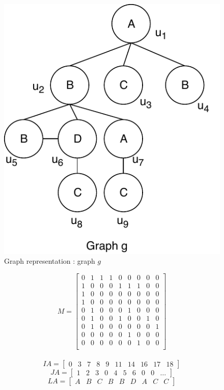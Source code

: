 \begin{figure}[h]
\centering 
\includegraphics[scale = 0.8]{images/csr.pdf}
\caption[Graph representation]{Graph representation : graph $g$} %
\label{fig:gallery} 
\end{figure}

\[
    M =
    \begin{bmatrix}
        0 & 1 & 1 & 1 & 0 & 0 & 0 & 0 & 0\\
        1 & 0 & 0 & 0 & 1 & 1 & 1 & 0 & 0\\
        1 & 0 & 0 & 0 & 0 & 0 & 0 & 0 & 0\\
        1 & 0 & 0 & 0 & 0 & 0 & 0 & 0 & 0\\
        0 & 1 & 0 & 0 & 0 & 1 & 0 & 0 & 0\\
        0 & 1 & 0 & 0 & 1 & 0 & 0 & 1 & 0\\
        0 & 1 & 0 & 0 & 0 & 0 & 0 & 0 & 1\\
        0 & 0 & 0 & 0 & 0 & 1 & 0 & 0 & 0\\
        0 & 0 & 0 & 0 & 0 & 0 & 1 & 0 & 0\\
    \end{bmatrix}
\]
\\
\[
    IA = 
    \begin{bmatrix}
        0 & 3 & 7 & 8 & 9 & 11 & 14 & 16 & 17 & 18
    \end{bmatrix}
\] 
\[
    JA =
    \begin{bmatrix}
        1 & 2 & 3 & 0 & 4 & 5 & 6 & 0 & 0 & \dots
    \end{bmatrix}
\]
\[
    LA =
    \begin{bmatrix}
        A & B & C & B & B & D & A & C & C
    \end{bmatrix}
\]


